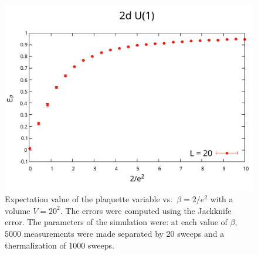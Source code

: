 \documentclass[12pt,a4paper]{article}
\begin{document}
	\begin{figure}
		\centering
		\includegraphics[scale=0.6]{n_term=1000-nmeas=5000-nskip=20.pdf}
		\caption{Expectation value of the plaquette variable vs.\ $\beta = 2/e^2$ with a volume $V = 20^2$. The errors were computed using the Jackknife error. The parameters of the simulation were: at each value of $\beta$, $5000$ measurements were made separated by 20 sweeps and a thermalization of 1000 sweeps.}
	\end{figure}
\end{document}
